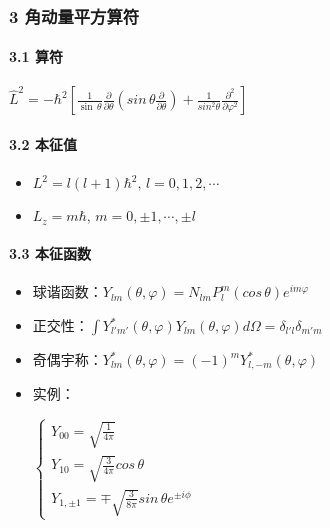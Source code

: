 \documentclass[UTF8,twocolumn]{ctexart}
\providecommand{\tightlist}{%
  \setlength{\itemsep}{0pt}\setlength{\parskip}{0pt}}
\let\oldparagraph\paragraph
\renewcommand{\paragraph}[1]{\oldparagraph{#1}\mbox{}}
\begin{document}
\hypertarget{ux89d2ux52a8ux91cfux5e73ux65b9ux7b97ux7b26}{%
\subsubsection{3
角动量平方算符}\label{ux89d2ux52a8ux91cfux5e73ux65b9ux7b97ux7b26}}

\hypertarget{ux7b97ux7b26-2}{%
\paragraph{ 3.1 算符}\label{ux7b97ux7b26-2}}

\begin{center}
\(\hat{L}^2=-\hbar^2[\frac{1}{\sin\,\theta}\frac{\partial}{\partial\theta}(sin\,\theta\frac{\partial}{\partial\theta})+\frac{1}{sin^2\theta}\frac{\partial^2}{\partial\varphi^2}]\)
\end{center}

\hypertarget{ux672cux5f81ux503c-3}{%
\paragraph{ 3.2 本征值}\label{ux672cux5f81ux503c-3}}

\begin{itemize}
\tightlist
\item
  \(L^2=l(l+1)\hbar^2,\,l=0,1,2,\cdots\)
\item
  \(L_z=m\hbar,\,m=0,\pm1,\cdots,\pm l\)
\end{itemize}

\hypertarget{ux672cux5f81ux51fdux6570-2}{%
\paragraph{ 3.3 本征函数}\label{ux672cux5f81ux51fdux6570-2}}

\begin{itemize}
\tightlist
\item
  球谐函数：\(Y_{lm}(\theta,\varphi)=N_{lm}P_l^m(cos\,\theta)e^{im\varphi}\)
\item
  正交性：\(\int Y_{l'm'}^*(\theta,\varphi)Y_{lm}(\theta,\varphi)d\Omega=\delta_{l'l}\delta_{m'm}\)
\item
  奇偶宇称：\(Y_{lm}^*(\theta,\varphi)=(-1)^mY_{l,-m}^*(\theta,\varphi)\)
\item
  实例： 
  \begin{center}
  $\begin{cases}
  Y_{00}=\sqrt{\frac{1}{4\pi}}\\
  Y_{10}=\sqrt{\frac{3}{4\pi}}cos\,\theta\\
  Y_{1,\pm1}=\mp\sqrt{\frac{3}{8\pi}}sin\,\theta e^{\pm i\phi}
  \end{cases}$
  \end{center}
  
\end{itemize}
\end{document}
